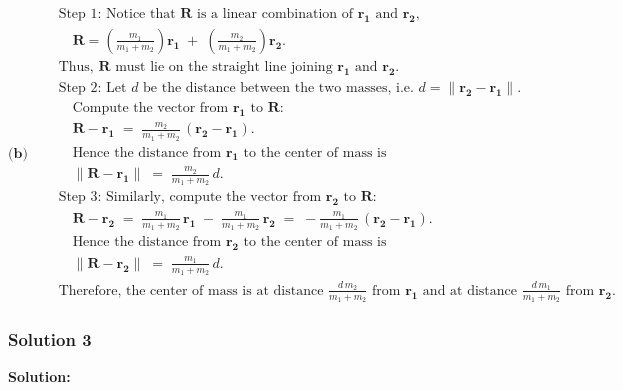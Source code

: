 \documentclass{article}
\begin{document}
\[
\textbf{(b)}\quad
\begin{aligned}
&\text{Step 1: Notice that } \mathbf{R} \text{ is a linear combination of } \mathbf{r_1} \text{ and } \mathbf{r_2},\\
&\quad \mathbf{R} = \left(\frac{m_1}{m_1+m_2}\right)\mathbf{r_1} 
\;+\;
\left(\frac{m_2}{m_1+m_2}\right)\mathbf{r_2}.
\\
&\text{Thus, } \mathbf{R}\text{ must lie on the straight line joining }\mathbf{r_1}\text{ and }\mathbf{r_2}\text{.}\\[6pt]
&\text{Step 2: Let }d\text{ be the distance between the two masses, i.e. }d = \|\mathbf{r_2} - \mathbf{r_1}\|.\\
&\quad\text{Compute the vector from }\mathbf{r_1}\text{ to }\mathbf{R}:\\
&\quad \mathbf{R} - \mathbf{r_1} \;=\;\frac{m_2}{m_1 + m_2}\,(\mathbf{r_2} - \mathbf{r_1}).\\
&\quad \text{Hence the distance from }\mathbf{r_1}\text{ to the center of mass is }\\
&\quad \|\mathbf{R} - \mathbf{r_1}\|
\;=\;\frac{m_2}{m_1 + m_2}\,d.\\[6pt]
&\text{Step 3: Similarly, compute the vector from }\mathbf{r_2}\text{ to }\mathbf{R}:\\
&\quad \mathbf{R} - \mathbf{r_2} 
\;=\;\frac{m_1}{m_1 + m_2}\,\mathbf{r_1} 
\;-\;\frac{m_1}{m_1 + m_2}\,\mathbf{r_2}
\;=\;-\frac{m_1}{m_1 + m_2}\,(\mathbf{r_2} - \mathbf{r_1}).\\
&\quad \text{Hence the distance from }\mathbf{r_2}\text{ to the center of mass is }\\
&\quad \|\mathbf{R} - \mathbf{r_2}\|
\;=\;\frac{m_1}{m_1 + m_2}\,d.\\[6pt]
&\text{Therefore, the center of mass is at distance }
\frac{d\,m_2}{m_1 + m_2}
\text{ from }\mathbf{r_1}
\text{ and at distance }
\frac{d\,m_1}{m_1 + m_2}
\text{ from }\mathbf{r_2}.
\end{aligned}
\] 

\subsubsection{Solution 3}

\noindent\textbf{Solution:}
\end{document}
